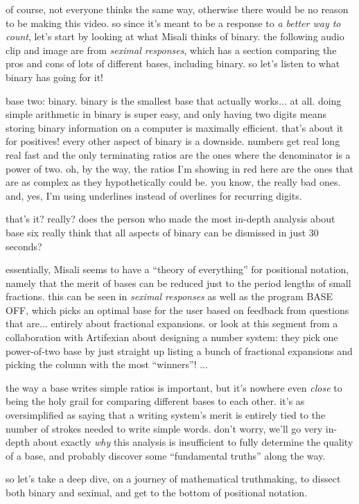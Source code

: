 \documentclass[../best.tex]{subfiles}
\begin{document}
of course, not everyone thinks the same way, otherwise there would be no reason to be making this video. so since it's meant to be a response to {\it a better way to count}, let's start by looking at what Misali thinks of binary. the following audio clip and image are from {\it seximal responses}, which has a section comparing the pros and cons of lots of different bases, including binary. so let's listen to what binary has going for it!

\begin{quoting}
	base two: binary. binary is the smallest base that actually works... at all. doing simple arithmetic in binary is super easy, and only having two digits means storing binary information on a computer is maximally efficient. that's about it for positives! every other aspect of binary is a downside. numbers get real long real fast and the only terminating ratios are the ones where the denominator is a power of two. oh, by the way, the ratios I'm showing in red here are the ones that are as complex as they hypothetically could be. you know, the really bad ones. and, yes, I'm using underlines instead of overlines for recurring digits.
\end{quoting}

that's it? really? does the person who made the most in-depth analysis about base six really think that all aspects of binary can be dismissed in just 30 seconds?

essentially, Misali seems to have a ``theory of everything'' for positional notation, namely that the merit of bases can be reduced just to the period lengths of small fractions. this can be seen in {\it seximal responses} as well as the program BASE OFF, which picks an optimal base for the user based on feedback from questions that are... entirely about fractional expansions.\myfootnote[i]{} or look at this segment from a collaboration with Artifexian about designing a number system: they pick one power-of-two base by just straight up listing a bunch of fractional expansions and picking the column with the most ``winners''!\myfootnote[i]{} ...

the way a base writes simple ratios is important, but it's nowhere even \emph{close} to being the holy grail for comparing different bases to each other. it's as oversimplified as saying that a writing system's merit is entirely tied to the number of strokes needed to write simple words. don't worry, we'll go very in-depth about exactly \emph{why} this analysis is insufficient to fully determine the quality of a base, and probably discover some ``fundamental truths'' along the way.

so let's take a deep dive, on a journey of mathematical truthmaking, to dissect both binary and seximal, and get to the bottom of positional notation.
\end{document}
